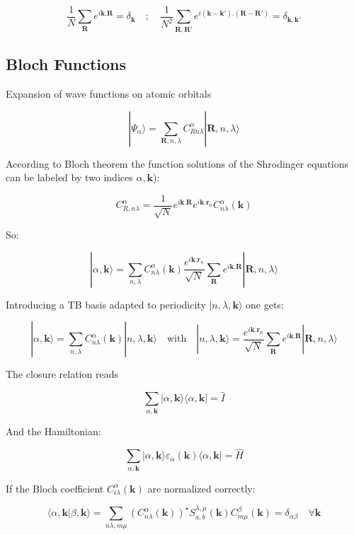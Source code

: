\documentclass{article}
\newcommand{\bra}[1]{\langle #1|}
\newcommand{\ket}[1]{|#1\rangle}
\newcommand{\braket}[2]{\langle #1|#2\rangle}
\newcommand{\op}[1]{\hat{#1}}
\begin{document}
\[ \frac{1}{N}\sum_{\mathbf{R}} e^{i\mathbf{k}.\mathbf{R}}=\delta_{\mathbf{k}} 
\quad ; \quad
\frac{1}{N^2}\sum_{\mathbf{R},\mathbf{R}'} 
e^{i(\mathbf{k}-\mathbf{k'}).(\mathbf{R}-\mathbf{R}')}=\delta_{\mathbf{k}, 
\mathbf{k}'} \]


\subsection{Bloch Functions}

\noindent
Expansion of wave functions on atomic orbitals

\[\displaystyle \ket{\Psi_{\alpha}}=\sum_{\mathbf{R},n,\lambda} C_{R n  \lambda}^{\alpha} \ket{\mathbf{R},n,\lambda }\]


\noindent
According to Bloch theorem  the function solutions of the Shrodinger equations can be labeled by two indices $\alpha, \mathbf{k}$):

\[ \displaystyle C_{R,n \lambda}^{\alpha}=\frac{1}{\sqrt{N}}e^{i  \mathbf{k}.\mathbf{R}}e^{i \mathbf{k}.\mathbf{r}_n} C_{n \lambda}^{\alpha}(\mathbf{k})\]

\noindent
So:

\[\displaystyle \ket{\alpha, \mathbf{k}}=\sum_{n,\lambda} C_{n \lambda}^{\alpha}(\mathbf{k})
\frac{e^{i \mathbf{k}.\mathbf{r}_n}}{\sqrt{N}} \sum_{\mathbf{R}} e^{i \mathbf{k}.\mathbf{R}} \ket{\mathbf{R},n,\lambda } \]

\noindent Introducing a TB basis adapted to periodicity $|n,\lambda, \mathbf{k} \rangle$ one gets:

\[\displaystyle \ket{\alpha, \mathbf{k} }=\sum_{n,\lambda} C_{n \lambda}^{\alpha}(\mathbf{k})\ket{n,\lambda,\mathbf{k}}
\quad \mbox{with} \quad \displaystyle 
\ket{n,\lambda,\mathbf{k}}=\frac{e^{i \mathbf{k}.\mathbf{r}_n}}{\sqrt{N}} \sum_{\mathbf{R}} e^{i \mathbf{k}.\mathbf{R}} \ket{\mathbf{R},n,\lambda }\]

\noindent
The closure relation reads

\[\displaystyle \sum_{\alpha,\mathbf{k}} \ket{\alpha,\mathbf{k}}  \bra{\alpha,\mathbf{k}}=\op{I}\]

\noindent
And the Hamiltonian:

\[ \sum_{\alpha,\mathbf{k}} \ket{\alpha,\mathbf{k}} \varepsilon_{\alpha}(\mathbf{k}) \bra{\alpha,\mathbf{k}}=\op{H}\]


\noindent
If the Bloch coefficient $C_{i \lambda}^{\alpha}(\mathbf{k})$ are normalized correctly:

\[ \braket{\alpha,\mathbf{k}}{\beta,\mathbf{k}}=
\sum_{n \lambda,m \mu} (C_{n \lambda}^{\alpha}(\mathbf{k}))^{\star} S_{a,b}^{\lambda,\mu}(\mathbf{k})C_{m \mu}^{\beta}(\mathbf{k})=\delta_{\alpha \beta}
\quad \forall \mathbf{k} \]
\end{document}
